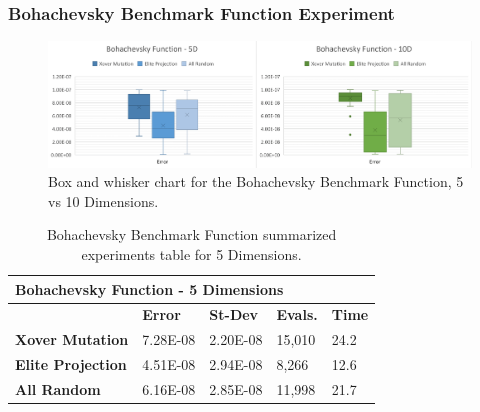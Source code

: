 \documentclass[graybox]{svmult}
\begin{document}
        \subsubsection{Bohachevsky Benchmark Function Experiment}

            \begin{figure}
                \includegraphics[width=\linewidth, frame]{img/fig_fun_bohachevsky.pdf}
                \caption{Box and whisker chart for the Bohachevsky Benchmark Function, 5 vs 10 Dimensions.} \label{fig.fun_bohachevsky}
                \end{figure}

            \begin{table}[]
                \scriptsize
                \centering
                \caption{Bohachevsky Benchmark Function summarized experiments table for 5 Dimensions.}\label{tab.fun_bohachevsky5}
                \begin{tabular}{@{}lllll@{}}
                \toprule
                \multicolumn{5}{l}{\textbf{Bohachevsky Function - 5 Dimensions}} \\ \midrule
                & \textbf{Error} & \textbf{St-Dev} & \textbf{Evals.} & \textbf{Time} \\
                \textbf{Xover Mutation} & 7.28E-08 & 2.20E-08 & 15,010 & 24.2 \\
                \textbf{Elite Projection} & 4.51E-08 & 2.94E-08 & 8,266 & 12.6 \\
                \textbf{All Random} & 6.16E-08 & 2.85E-08 & 11,998 & 21.7 \\ \bottomrule
                \end{tabular}
                \end{table}
\end{document}

